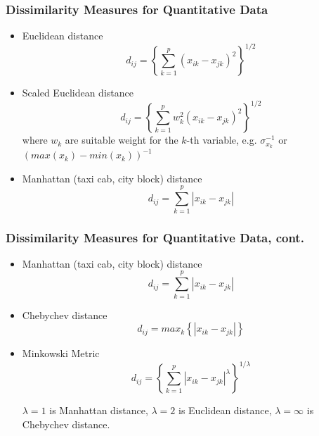 \documentclass{beamer}
\begin{document}
\begin{frame}
  \frametitle{Dissimilarity Measures for Quantitative Data}


\begin{itemize}
\item Euclidean distance
\[
d_{ij} = \left\{ \sum_{k=1}^p (x_{ik} - x_{jk})^2 
         \right\} ^{1/2}
\]


\item Scaled Euclidean distance
\[
d_{ij} = \left\{ \sum_{k=1}^p w_k^2 (x_{ik} - x_{jk})^2 
         \right\} ^{1/2}
\]
where $w_k$ are suitable weight for the $k$-th variable, e.g. $\sigma_{x_k}^{-1}$ or $(max(x_k)-min(x_k))^{-1}$

\item Manhattan (taxi cab, city block) distance
\[
d_{ij} = \sum_{k=1}^p | x_{ik} - x_{jk} |         
\]

\end{itemize}
\end{frame}


\begin{frame}
  \frametitle{Dissimilarity Measures for Quantitative Data, cont.}


\begin{itemize}

\item Manhattan (taxi cab, city block) distance
\[
d_{ij} = \sum_{k=1}^p | x_{ik} - x_{jk} |         
\]

\item Chebychev distance
\[
d_{ij} = max_k \left\{ | x_{ik} - x_{jk} | \right\}
\]

\item Minkowski Metric
\[
d_{ij} = \left\{ \sum_{k=1}^p |x_{ik} - x_{jk}|^\lambda
         \right\} ^{1/ \lambda}
\]

$\lambda = 1$ is Manhattan distance, $\lambda = 2$ is Euclidean distance, $\lambda = \infty$ is Chebychev distance.

\end{itemize}
\end{frame}
\end{document}

